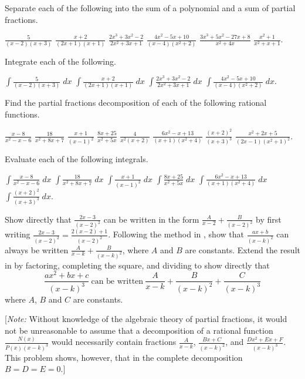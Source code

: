 \begin{exercises}

Separate each of the following into the sum of a
polynomial and a sum of partial fractions.
\begin{exenum}
\x
$\frac{5}{(x-2)(x+3)}$
\x
$\frac{x+2}{(2x+1)(x+1)}$
\x
$\frac{2x^3+3x^2-2}{2x^2+3x+1}$
\x
$\frac{4x^2-5x+10}{(x-4)(x^2+2)}$
\x
$\frac{3x^3+5x^2-27x+8}{x^2+4x}$
\x
$\frac{x^2+1}{x^2+x+1}$.
\end{exenum}

Integrate each of the following.
\begin{exenum}
\x
$\int \frac{5}{(x-2)(x+3)} \; dx$
\x
$\int \frac{x+2}{(2x+1)(x+1)} \; dx$
\x
$\int \frac{2x^3+3x^2-2}{2x^2+3x+1} \; dx$
\x
$\int \frac{4x^2-5x+10}{(x-4)(x^2+2)} \; dx$.
\end{exenum}

Find the partial fractions decomposition of each
of the following rational functions.
\begin{exenum}
\x
$\frac{x-8}{x^2-x-6}$
\x
$\frac{18}{x^2+8x+7}$
\x
$\frac{x+1}{(x-1)^2}$
\x
$\frac{8x+25}{x^2+5x}$
\x
$\frac{4}{x^2(x+2)}$
\x
$\frac{6x^2-x+13}{(x+1)(x^2+4)}$
\x
$\frac{(x+2)^2}{(x+3)^3}$
\x
$\frac{x^2+2x+5}{(2x-1)(x^2+1)^2}$.
\end{exenum}

Evaluate each of the following integrals.
\begin{exenum}
\x
$\int \frac{x-8}{x^2-x-6} \; dx$
\x
$\int \frac{18}{x^2+8x+7} \; dx$
\x
$\int \frac{x+1}{(x-1)^2} \; dx$
\x
$\int \frac{8x+25}{x^2+5x} \; dx$
\x
$\int \frac{6x^2-x+13}{(x+1)(x^2+4)} \; dx$
\x
$\int \frac{(x+2)^2}{(x+3)^3} \; dx$.
\end{exenum}

\begin{exenum}
\x
{}
Show directly that $\frac{2x-3}{(x-2)^2}$
can be written in the form
$\frac{A}{x-2} + \frac{B}{(x-2)^2}$
by first writing
$\frac{2x-3}{(x-2)^2} =
\frac{2(x-2)+1}{(x-2)^2}$.
\x
{}
Following the method in ,
show that $\frac{ax+b}{(x-k)^2}$ can always be
written $\frac{A}{x-k} + \frac{B}{(x-k)^2}$,
where $A$ and $B$ are constants.
\x
Extend the result in  by factoring,
completing the square, and dividing to show
directly that
\[
\frac{ax^2+bx+c}{(x-k)^3}
\: \mbox{can be written} \:
\frac{A}{x-k}+\frac{B}{(x-k)^2}+\frac{C}{(x-k)^3}
\]
where $A$, $B$ and $C$ are constants.

[\emph{Note:} Without knowledge of the algebraic
theory of partial fractions, it would not be
unreasonable to assume that a decomposition
of a rational function $\frac{N(x)}{P(x)(x-k)^3}$
would necessarily contain fractions
$\frac{A}{x-k}$, $\frac{Bx+C}{(x-k)^2}$,
and $\frac{Dx^2+Ex+F}{(x-k)^3}$.
This problem shows, however, that in the complete
decomposition $B = D = E = 0$.]
\end{exenum}


\end{exercises}
